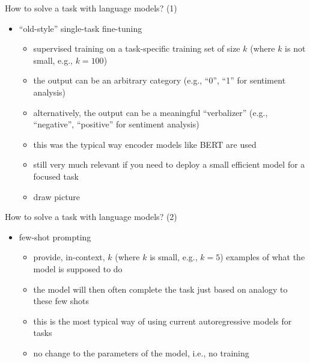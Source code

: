 \begin{frame}{How to solve a task with language models? (1)}

\vfill

\begin{itemize}
    \item ``old-style'' single-task fine-tuning 
        \begin{itemize}
            \item supervised training on a task-specific
        training set of size $k$ (where $k$ is not small,
        e.g., $k=100$)
        \item the output can be an arbitrary category (e.g.,
        ``0'', ``1'' for sentiment analysis)
            \item alternatively, the output can be a
        meaningful ``verbalizer'' (e.g., ``negative'',
        ``positive'' for sentiment analysis)
        \item this was the typical way encoder models like
        BERT are used
        \item still very much relevant if you need to deploy
        a small efficient model for a focused task
\item draw picture
        \end{itemize}
\end{itemize}

\vfill

\end{frame}
\begin{frame}{How to solve a task with language models? (2)}

\vfill

\begin{itemize}
    \item few-shot prompting
        \begin{itemize}
            \item provide, in-context,  $k$ (where $k$ is small, e.g., $k=5$) examples of what the model is
supposed to do
        \item the model will then often complete the task
        just based on analogy to these few shots
        \item this is the most typical way of using current
        autoregressive models for tasks
\item no change to the parameters of the model, i.e., no training
\end{itemize}
\end{itemize}

\vfill

\end{frame}

